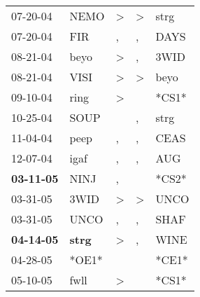 \begin{supertabular}{p{0.07\textwidth}p{0.06\textwidth}p{0.02\textwidth}p{0.02\textwidth}p{0.06\textwidth}}
          07-20-04\textsuperscript{} &           NEMO\textsuperscript{} &     \textgreater &     \textgreater &           strg\textsuperscript{} \\
          07-20-04\textsuperscript{} &            FIR\textsuperscript{} &                , &                , &           DAYS\textsuperscript{} \\
          08-21-04\textsuperscript{} &           beyo\textsuperscript{} &     \textgreater &                , &           3WID\textsuperscript{} \\
          08-21-04\textsuperscript{} &           VISI\textsuperscript{} &     \textgreater &     \textgreater &           beyo\textsuperscript{} \\
          09-10-04\textsuperscript{} &           ring\textsuperscript{} &     \textgreater &                  &                            *CS1* \\
          10-25-04\textsuperscript{} &           SOUP\textsuperscript{} &                  &                , &           strg\textsuperscript{} \\
          11-04-04\textsuperscript{} &           peep\textsuperscript{} &                , &                , &           CEAS\textsuperscript{} \\
          12-07-04\textsuperscript{} &           igaf\textsuperscript{} &                , &                , &            AUG\textsuperscript{} \\
 \textbf{03-11-05\textsuperscript{}} &           NINJ\textsuperscript{} &                , &                  &                            *CS2* \\
          03-31-05\textsuperscript{} &           3WID\textsuperscript{} &     \textgreater &     \textgreater &           UNCO\textsuperscript{} \\
          03-31-05\textsuperscript{} &           UNCO\textsuperscript{} &                , &                , &           SHAF\textsuperscript{} \\
 \textbf{04-14-05\textsuperscript{}} &  \textbf{strg\textsuperscript{}} &     \textgreater &                , &           WINE\textsuperscript{} \\
          04-28-05\textsuperscript{} &                            *OE1* &                  &                  &                            *CE1* \\
          05-10-05\textsuperscript{} &           fwll\textsuperscript{} &     \textgreater &                  &                            *CS1* \\

\end{supertabular}
